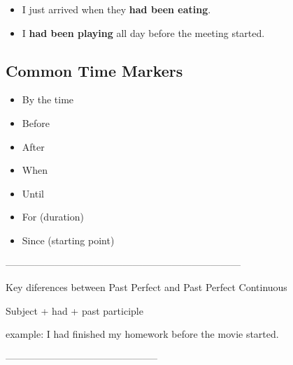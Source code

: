 \begin{center}
\end{center}

\begin{itemize}
    \item I just arrived when they \textbf{had been eating}.
    \item I \textbf{had been playing} all day before the meeting started.
\end{itemize}

\subsection{Common Time Markers}

\begin{itemize}
    \item By the time
    \item Before
    \item After
    \item When
    \item Until
    \item For (duration)
    \item Since (starting point)
\end{itemize}



------------------------------------------------------------------------


Key diferences between Past Perfect and Past Perfect Continuous 



Subject + had + past participle

example: I had finished my homework before the movie started.



-----------------------------------------------





